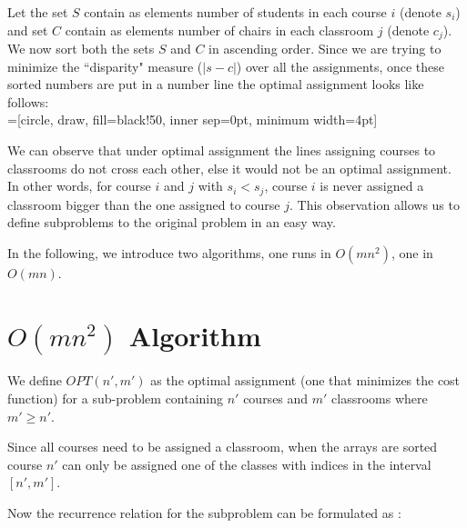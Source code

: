 
Let the set $S$ contain as elements number of students in each course $i$ (denote $s_i$) and set $C$ contain as elements number of chairs in each classroom $j$ (denote $c_j$). We now sort both the sets $S$ and $C$ in ascending order. Since we are trying to minimize the ``disparity" measure ($|s - c|$) over all the assignments, once these sorted numbers are put in a number line the optimal assignment looks like follows: \\



=[circle, draw, fill=black!50,
                        inner sep=0pt, minimum width=4pt]
\quad



We can observe that under optimal assignment the lines assigning courses to classrooms do not cross each other, else it would not be an optimal assignment. In other words, for course $i$ and $j$ with $s_i < s_j$, course $i$ is never assigned a classroom bigger than the one assigned to course $j$. This observation allows us to define subproblems to the original problem in an easy way.

In the following, we introduce two algorithms, one runs in $O(mn^2)$, one in $O(mn)$.

\section{$O(mn^2)$ Algorithm}

We define $OPT(n', m')$ as the optimal assignment (one that minimizes the cost function) for a sub-problem containing $n'$ courses and $m'$ classrooms where $m' \geq n'$.



Since all courses need to be assigned a classroom, when the arrays are sorted course $n'$ can only be assigned one of the classes with indices in the interval $[n', m']$.

Now the recurrence relation for the subproblem can be formulated as :

